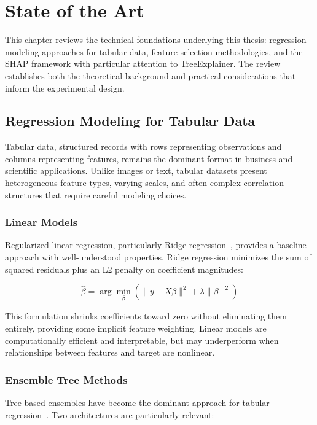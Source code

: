 \chapter{State of the Art}

This chapter reviews the technical foundations underlying this thesis: regression modeling approaches for tabular data, feature selection methodologies, and the SHAP framework with particular attention to TreeExplainer. The review establishes both the theoretical background and practical considerations that inform the experimental design.

\section{Regression Modeling for Tabular Data}

Tabular data, structured records with rows representing observations and columns representing features, remains the dominant format in business and scientific applications. Unlike images or text, tabular datasets present heterogeneous feature types, varying scales, and often complex correlation structures that require careful modeling choices.

\subsection{Linear Models}

Regularized linear regression, particularly Ridge regression~\cite{hoerl1970ridge}, provides a baseline approach with well-understood properties. Ridge regression minimizes the sum of squared residuals plus an L2 penalty on coefficient magnitudes:

\begin{equation}
\hat{\beta} = \arg\min_{\beta} \left( \|y - X\beta\|^2 + \lambda\|\beta\|^2 \right)
\end{equation}

This formulation shrinks coefficients toward zero without eliminating them entirely, providing some implicit feature weighting. Linear models are computationally efficient and interpretable, but may underperform when relationships between features and target are nonlinear.

\subsection{Ensemble Tree Methods}

Tree-based ensembles have become the dominant approach for tabular regression~\cite{breiman2001random}. Two architectures are particularly relevant:

